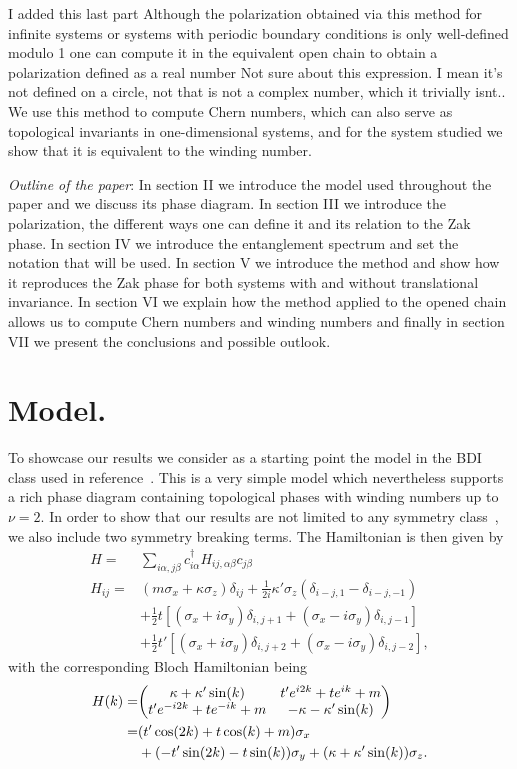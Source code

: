 \documentclass[twocolumn,amsmath,longbibliography,amssymb,superscriptaddress]{revtex4-1}
\newcommand{\carlos}[1]{{\color{red} #1}}
\begin{document}
\carlos{I added this last part}
Although the polarization obtained via this method for infinite systems or systems with periodic boundary conditions is only well-defined modulo 1 one can compute it in the equivalent open chain to obtain a polarization defined as a real number \carlos{Not sure about this expression. I mean it's not defined on a circle, not that is not a complex number, which it trivially isnt.}. We use this method to compute Chern numbers, which can also serve as topological invariants in one-dimensional systems, and for the system studied we show that it is equivalent to the winding number.

\emph{Outline of the paper}: In section II we introduce the model used throughout the paper and we discuss its phase diagram. In section III we introduce the polarization, the different ways one can define it and its relation to the Zak phase. In section IV we introduce the entanglement spectrum and set the notation that will be used. In section V we introduce the method and show how it reproduces the Zak phase for both systems with and without translational invariance. In section VI we explain how the method applied to the opened chain allows us to compute Chern numbers and winding numbers and finally in section VII we present the conclusions and possible outlook.

\section{Model.}
To showcase our results we consider as a starting point the model in the BDI class used in reference~\cite{Song2014}. 
This is a very simple model which nevertheless supports a rich phase diagram containing topological phases with winding numbers up to $\nu =2$. 
In order to show that our results are not limited to any symmetry class~\cite{ryu2010topological}, we also include two symmetry breaking terms. 
The Hamiltonian is then given by
\begin{align}
H =& \sum_{i\alpha,j\beta} c_{i\alpha}^\dagger H_{ij,\alpha \beta} c_{j\beta} \\
H_{ij} =& (m \sigma_x + \kappa \sigma_z)\delta_{ij}  + \frac{1}{2i}\kappa'\sigma_z (\delta_{i-j,1}-\delta_{i-j,-1})\nonumber\\
&+ \frac{1}{2} t \left[(\sigma_x + i \sigma_y)\delta_{i,j+1} + (\sigma_x - i \sigma_y) \delta_{i,j-1} \right] \nonumber\\
&+  \frac{1}{2} t' \left[(\sigma_x + i \sigma_y)\delta_{i,j+2} + (\sigma_x - i \sigma_y) \delta_{i,j-2} \right],
\label{bdi_model}
\end{align}
with the corresponding Bloch Hamiltonian being
\begin{align}
H(k)=&\mqty( \kappa + \kappa' \sin(k) & t' e^{i2k} + t e^{ik}+m \nonumber\\t' e^{-i2k} + t e^{-ik}+m & -\kappa-\kappa' \sin(k)  )\nonumber \\
=& (t' \cos(2k)+t\cos(k)+m)\sigma_x \\
&+ (-t' \sin(2k)-t\sin(k))\sigma_y + (\kappa+\kappa'\sin(k)) \sigma_z.\nonumber
\end{align}
\end{document}
